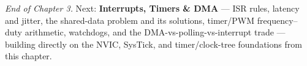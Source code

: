 \begin{partnote}
\emph{End of Chapter 3.} Next: \textbf{Interrupts, Timers \& DMA} --- ISR
rules, latency and jitter, the shared-data problem and its solutions, timer/PWM
frequency--duty arithmetic, watchdogs, and the DMA-vs-polling-vs-interrupt
trade --- building directly on the NVIC, SysTick, and timer/clock-tree
foundations from this chapter.
\end{partnote}

